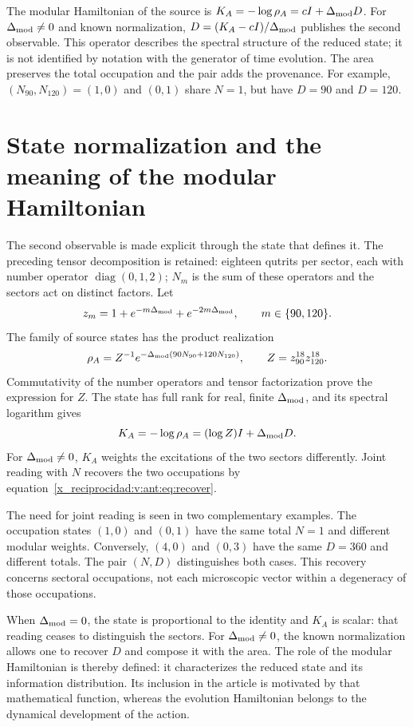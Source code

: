 The modular Hamiltonian of the source is
$K_A=-\log\rho_A=cI+\Delta_{\rm mod}D$.
For $\Delta_{\rm mod}\ne0$ and known normalization,
$D=(K_A-cI)/\Delta_{\rm mod}$ publishes the second observable.
This operator describes the spectral structure of the reduced state;
it is not identified by notation with the generator of time evolution.
The area preserves the total occupation and the pair adds the provenance.
For example, $(N_{90},N_{120})=(1,0)$ and $(0,1)$ share $N=1$,
but have $D=90$ and $D=120$.


\section{State normalization and the meaning of the modular Hamiltonian}
The second observable is made explicit through the state that defines it.
The preceding tensor decomposition is retained: eighteen qutrits
per sector, each with number operator $\operatorname{diag}(0,1,2)$;
$N_m$ is the sum of these operators and the sectors act on distinct
factors. Let
\[
 z_m=1+e^{-m\Delta_{\rm mod}}+e^{-2m\Delta_{\rm mod}},
 \qquad m\in\{90,120\}.
\]
The family of source states has the product realization
\[
 \rho_A=Z^{-1}e^{-\Delta_{\rm mod}(90N_{90}+120N_{120})},
 \qquad Z=z_{90}^{18}z_{120}^{18}.
\]
Commutativity of the number operators and tensor factorization
prove the expression for $Z$. The state has full rank for
real, finite $\Delta_{\rm mod}$, and its spectral logarithm gives
\[
 K_A=-\log\rho_A=(\log Z)I+\Delta_{\rm mod}D.
\]
For $\Delta_{\rm mod}\ne0$, $K_A$ weights the excitations
of the two sectors differently. Joint reading with $N$ recovers the two occupations
by equation~\eqref{x_reciprocidad:v:ant:eq:recover}.

The need for joint reading is seen in two complementary examples.
The occupation states $(1,0)$ and $(0,1)$ have the same total $N=1$
and different modular weights. Conversely, $(4,0)$ and $(0,3)$ have
the same $D=360$ and different totals. The pair $(N,D)$ distinguishes both
cases. This recovery concerns sectoral occupations, not
each microscopic vector within a degeneracy of those occupations.

When $\Delta_{\rm mod}=0$, the state is proportional to the identity
and $K_A$ is scalar: that reading ceases to distinguish the sectors.
For $\Delta_{\rm mod}\ne0$, the known normalization allows one to recover
$D$ and compose it with the area. The role of the modular Hamiltonian
is thereby defined: it characterizes the reduced state and its information distribution.
Its inclusion in the article is motivated by that mathematical function,
whereas the evolution Hamiltonian belongs to the dynamical development
of the action.

